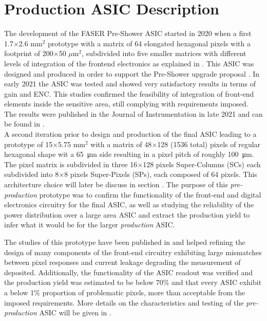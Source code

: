 	\section{Production ASIC Description }
	The development of the FASER Pre-Shower ASIC started in 2020 when a first 1.7$\times$2.6 mm$^2$ prototype with a matrix of 64 elongated hexagonal pixels with a footprint of 200$\times$50 $\mu$m$^2$, subdivided into five smaller matrices with different levels of integration of the frontend electronics as explained in \cite{FASER_proto0}. This ASIC was designed and produced in order to support the Pre-Shower upgrade proposal . In early 2021 the ASIC was tested and showed very satisfactory results in terms of gain and ENC. This studies confirmed the feasibility of integration of front-end elements inside the sensitive area, still complying with requirements imposed. The results were published in the Journal of Instrumentation in late 2021 and can be found in \cite{FASER_proto0}. \\
	
	A second iteration prior to design and production of the final ASIC leading to a prototype of 15$\times$5.75 mm$^2$ with a matrix of 48$\times$128 (1536 total) pixels of regular hexagonal shape wit a \SI{65}{\micro\meter} side resulting in a pixel pitch of roughly \SI{100}{\micro\meter}. The pixel matrix is subdivided in three 16$\times$128 pixels Super-Columns (SCs) each subdivided into 8$\times$8 pixels Super-Pixels (SPs), each composed of 64 pixels. This architecture choice will later be discuss in section . The purpose of this \textit{pre-production} prototype was to confirm the functionality of the front-end and digital electronics circuitry for the final ASIC, as well as studying the reliability of the power distribution over a large area ASIC and extract the production yield to infer what it would be for the larger \textit{production} ASIC. 
	
	The studies of this prototype have been published in  and helped refining the design of many components of the front-end circuitry 	exhibiting large mismatches between pixel responses and current leakage degrading the measurement of deposited. Additionally, the functionality of the ASIC readout was verified and the production yield was estimated to be below 70\% and that every ASIC exhibit a below 1\% proportion of problematic pixels, more than acceptable from the imposed requirements. More details on the characteristics and testing of the \textit{pre-production} ASIC will be given in . \\
	
